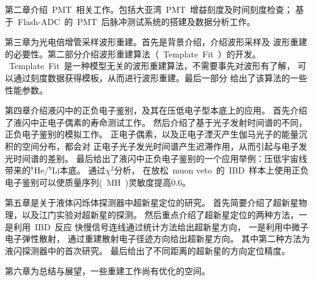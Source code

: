 第二章介绍~PMT~相关工作。包括大亚湾~PMT~增益刻度及时间刻度检查；
基于~Flash-ADC~的~PMT~后脉冲测试系统的搭建及数据分析工作。

第三章为光电倍增管采样波形重建。首先是背景介绍，介绍波形采样及
波形重建的必要性。第二部分介绍波形重建算法（~Template~Fit~）的开发。
~Template~Fit~是一种模型无关的波形重建算法，不需要事先对波形有了解，
可以通过刻度数据获得模板，从而进行波形重建。最后一部分
给出了该算法的一些性能参数。

第四章介绍液闪中的正负电子鉴别，及其在压低电子型本底上的应用。
首先介绍了液闪中正电子偶素的寿命测试工作。
然后介绍了基于光子发射时间谱的不同，正负电子鉴别的模拟工作。
正电子偶素，以及正电子湮灭产生伽马光子的能量沉积的空间分布，都会对
正电子光子发光时间谱产生迟滞作用，从而引起与电子发光时间谱的差别。
最后给出了液闪中正负电子鉴别的一个应用举例：压低宇宙线带来的$^8$He/$^9$Li本底。
通过$\chi^2$分析，
在放松~muon veto~的~IBD~样本上使用正负电子鉴别可以使质量序列(~MH~)灵敏度提高0.6。

第五章是关于液体闪烁体探测器中超新星定位的研究。
首先简要介绍了超新星物理，以及江门实验对超新星的探测。
然后重点介绍了超新星定位的两种方法，一是利用~IBD~反应
快慢信号连线通过统计方法给出超新星方向，
一是利用中微子电子弹性散射，
通过重建散射电子径迹方向给出超新星方向。
其中第二种方法为
液闪探测器中的首次研究。
最后给出了不同距离的超新星的方向定位精度。

第六章为总结与展望，一些重建工作尚有优化的空间。
